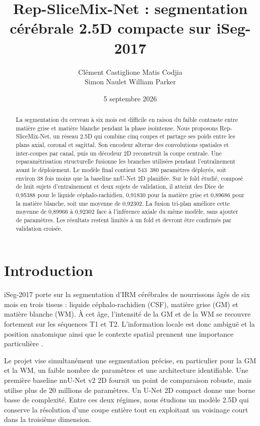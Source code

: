 \documentclass[11pt,a4paper]{article}
\title{Rep-SliceMix-Net : segmentation cérébrale 2.5D compacte sur iSeg-2017}
\author{Clément Castiglione \quad Matis Codjia\\
        Simon Naulet \quad William Parker}
\date{5 septembre 2026}
\begin{document}
\maketitle

\begin{abstract}
La segmentation du cerveau à six mois est difficile en raison du faible
contraste entre matière grise et matière blanche pendant la phase isointense.
Nous proposons Rep-SliceMix-Net, un réseau 2.5D qui combine cinq coupes et
partage ses poids entre les plans axial, coronal et sagittal. Son encodeur
alterne des convolutions spatiales et inter-coupes par canal, puis un décodeur
2D reconstruit la coupe centrale. Une reparamétrisation structurelle fusionne
les branches utilisées pendant l'entraînement avant le déploiement. Le modèle
final contient 543~380 paramètres déployés, soit environ 38 fois moins que la
baseline nnU-Net 2D planifiée. Sur le fold étudié, composé de huit sujets
d'entraînement et deux sujets de validation, il atteint des Dice de 0,95388 pour
le liquide céphalo-rachidien, 0,91830 pour la matière grise et 0,89686 pour la
matière blanche, soit une moyenne de 0,92302. La fusion tri-plan améliore cette
moyenne de 0,89966 à 0,92302 face à l'inférence axiale du même modèle, sans
ajouter de paramètres. Les résultats restent limités à un fold et devront être
confirmés par validation croisée.
\end{abstract}

\section{Introduction}

iSeg-2017 porte sur la segmentation d'IRM cérébrales de nourrissons âgés de six
mois en trois tissus : liquide céphalo-rachidien (CSF), matière grise (GM) et
matière blanche (WM). À cet âge, l'intensité de la GM et de la WM se recouvre
fortement sur les séquences T1 et T2. L'information locale est donc ambiguë et
la position anatomique ainsi que le contexte spatial prennent une importance
particulière \cite{wang2019iseg}.

Le projet vise simultanément une segmentation précise, en particulier pour la
GM et la WM, un faible nombre de paramètres et une architecture identifiable.
Une première baseline nnU-Net v2 2D fournit un point de comparaison robuste,
mais utilise plus de 20 millions de paramètres. Un U-Net 2D compact donne une
borne basse de complexité. Entre ces deux régimes, nous étudions un modèle 2.5D
qui conserve la résolution d'une coupe entière tout en exploitant un voisinage
court dans la troisième dimension.
\end{document}
